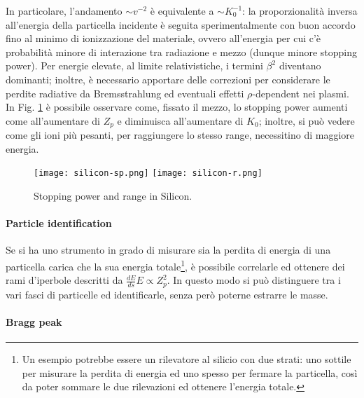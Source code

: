 In particolare, l'andamento $ \sim v^{-2} $ è equivalente a $ \sim K_0^{-1} $: la proporzionalità inversa all'energia della particella incidente è seguita sperimentalmente con buon accordo fino al minimo di ionizzazione del materiale, ovvero all'energia per cui c'è probabilità minore di interazione tra radiazione e mezzo (dunque minore stopping power). Per energie elevate, al limite relativistiche, i termini $ \beta^2 $ diventano dominanti; inoltre, è necessario apportare delle correzioni per considerare le perdite radiative da Bremsstrahlung ed eventuali effetti $ \rho $-dependent nei plasmi.\\
In Fig. \ref{silicon} è possibile osservare come, fissato il mezzo, lo stopping power aumenti come all'aumentare di $ Z_p $ e diminuisca all'aumentare di $ K_0 $; inoltre, si può vedere come gli ioni più pesanti, per raggiungere lo stesso range, necessitino di maggiore energia.

\begin{figure}[!b]
	\centering
	\texttt{[image: silicon-sp.png]}
	\texttt{[image: silicon-r.png]}
	\caption{Stopping power and range in Silicon.}
	\label{silicon}
\end{figure}

\paragraph{Particle identification}

Se si ha uno strumento in grado di misurare sia la perdita di energia di una particella carica che la sua energia totale\footnote{Un esempio potrebbe essere un rilevatore al silicio con due strati: uno sottile per misurare la perdita di energia ed uno spesso per fermare la particella, così da poter sommare le due rilevazioni ed ottenere l'energia totale.}, è possibile correlarle ed ottenere dei rami d'iperbole descritti da $ \frac{dE}{ds} E \propto Z_p^2 $. In questo modo si può distinguere tra i vari fasci di particelle ed identificarle, senza però poterne estrarre le masse.

\paragraph{Bragg peak}

